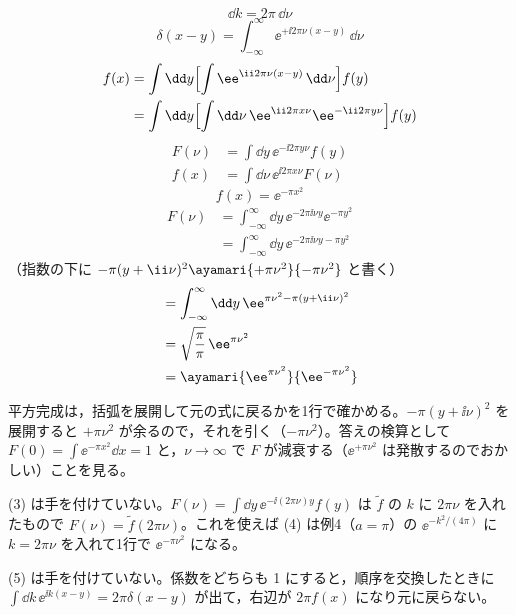 \[ \dd k=2\pi\,\dd\nu \]
\[ \delta(x-y)=\int_{-\infty}^{\infty}\ee^{+\ii2\pi\nu(x-y)}\,\dd\nu \]
\begin{align*}
  f(x)&=\int\dd y\Bigl[\int\ee^{\ii2\pi\nu(x-y)}\,\dd\nu\Bigr]f(y)\\
  &=\int\dd y\Bigl[\int\dd\nu\,\ee^{\ii2\pi x\nu}\ee^{-\ii2\pi y\nu}\Bigr]f(y)
\end{align*}
\begin{align*}
  F(\nu)&=\int\dd y\,\ee^{-\ii2\pi y\nu}f(y)\\
  f(x)&=\int\dd\nu\,\ee^{\ii2\pi x\nu}F(\nu)
\end{align*}
\mikai
{}
\[ f(x)=\ee^{-\pi x^{2}} \]
\begin{align*}
  F(\nu)&=\int_{-\infty}^{\infty}\dd y\,\ee^{-2\pi\ii\nu y}\ee^{-\pi y^{2}}\\
  &=\int_{-\infty}^{\infty}\dd y\,\ee^{-2\pi\ii\nu y-\pi y^{2}}
\end{align*}
（指数の下に $-\pi(y+\ii\nu)^{2}\ayamari{+\pi\nu^{2}}{-\pi\nu^{2}}$ と書く）
\begin{align*}
  &=\int_{-\infty}^{\infty}\dd y\,\ee^{\pi\nu^{2}-\pi(y+\ii\nu)^{2}}\\
  &=\sqrt{\frac{\pi}{\pi}}\,\ee^{\pi\nu^{2}}\\
  &=\ayamari{\ee^{\pi\nu^{2}}}{\ee^{-\pi\nu^{2}}}
\end{align*}
\mikai
\item 平方完成は，括弧を展開して元の式に戻るかを1行で確かめる。$-\pi(y+\ii\nu)^{2}$ を展開すると $+\pi\nu^{2}$ が余るので，それを引く（$-\pi\nu^{2}$）。答えの検算として $F(0)=\int\ee^{-\pi x^{2}}\dd x=1$ と，$\nu\to\infty$ で $F$ が減衰する（$\ee^{+\pi\nu^{2}}$ は発散するのでおかしい）ことを見る。
\item (3) は手を付けていない。$F(\nu)=\int\dd y\,\ee^{-\ii(2\pi\nu)y}f(y)$ は $\tilde f$ の $k$ に $2\pi\nu$ を入れたもので $F(\nu)=\tilde f(2\pi\nu)$。これを使えば (4) は例4（$a=\pi$）の $\ee^{-k^{2}/(4\pi)}$ に $k=2\pi\nu$ を入れて1行で $\ee^{-\pi\nu^{2}}$ になる。
\item (5) は手を付けていない。係数をどちらも 1 にすると，順序を交換したときに $\int\dd k\,\ee^{\ii k(x-y)}=2\pi\delta(x-y)$ が出て，右辺が $2\pi f(x)$ になり元に戻らない。
